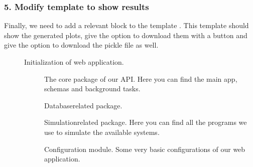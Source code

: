 \documentclass[a4paper,landscape,10pt,english]{sphinxmanual}
\begin{document}
\subsubsection{5. Modify  template to show results}
\label{\detokenize{code_docs/new_simulation:modify-results-html-template-to-show-results}}
Finally, we need to add a relevant  block to the template
. This template should show the
generated plots, give the option to download them with a button and
give the option to download the pickle file as well.
\begin{description}
\item[{{\hyperref[\detokenize{code_docs/simulation_api:module-simulation_api}]{}}}] \leavevmode
Initialization of web application.
\begin{description}
\item[{{\hyperref[\detokenize{code_docs/simulation_api.controller:module-simulation_api.controller}]{}}}] \leavevmode
The core package of our API. Here you can find the main app, schemas and
background tasks.

\item[{{\hyperref[\detokenize{code_docs/simulation_api.model:module-simulation_api.model}]{}}}] \leavevmode
Database\sphinxhyphen{}related package.

\item[{{\hyperref[\detokenize{code_docs/simulation_api.simulation:module-simulation_api.simulation}]{}}}] \leavevmode
Simulation\sphinxhyphen{}related package. Here you can find all the programs we use to
simulate the available systems.

\item[{{\hyperref[\detokenize{code_docs/simulation_api.config:module-simulation_api.config}]{}}}] \leavevmode
Configuration module. Some very basic configurations of our web application.

\end{description}

\end{description}
\end{document}
